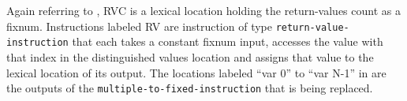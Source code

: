Again referring to , RVC is a lexical
location holding the return-values count as a fixnum.  Instructions
labeled RV are instruction of type \texttt{return-value-instruction}
that each takes a constant fixnum input, accesses the value with that
index in the distinguished values location and assigns that value to
the lexical location of its output.  The locations labeled ``var 0''
to ``var N-1'' in  are the outputs of the
\texttt{multiple-to-fixed-instruction} that is being replaced.
